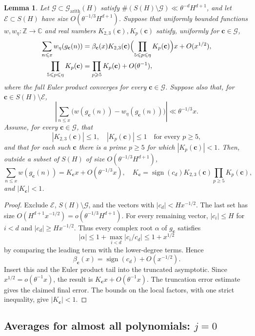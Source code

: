 \documentclass[12pt,reqno]{amsart}
\numberwithin{equation}{section}
\newtheorem{lemma}[theorem]{Lemma}
\theoremstyle{definition}
\renewcommand{\le}{\leqslant}
\renewcommand{\ge}{\geqslant}
\newcommand{\ZZ}{\mathbb{Z}}
\newcommand{\CC}{\mathbb{C}}
\newcommand{\cc}{\mathbf{c}}
\DeclareMathOperator{\sign}{sign}
\begin{document}
\begin{lemma}\label{lem:final-assembly}
Let $\mathcal G\subset\mathcal G_{\mathrm{arith}}(H)$ satisfy $\#(S(H)\setminus\mathcal G)\ll\theta^{-d}H^{d+1}$, and let $\mathcal E\subset S(H)$ have size $O(\theta^{-1/3}H^{d+1})$.
Suppose that uniformly bounded functions $w,w_\eta:\ZZ\to\CC$ and real numbers $K_{2,3}(\cc),K_p(\cc)$ satisfy, uniformly for $\cc\in\mathcal G$,
\begin{align*}
\sum_{n\le x}w_\eta(g_\cc(n))
&=\beta_\cc(x)K_{2,3}(\cc)
  \Bigl(\prod_{5\le p\le\eta}K_p(\cc)\Bigr)x+O(x^{1/2}),\\
\prod_{5\le p\le\eta}K_p(\cc)
&=\prod_{p\ge5}K_p(\cc)+O(\theta^{-1}),
\end{align*}
where the full Euler product converges for every $\cc\in\mathcal G$.
Suppose also that, for $\cc\in S(H)\setminus\mathcal E$,
\[
\left|\sum_{n\le x}
\bigl(w(g_\cc(n))-w_\eta(g_\cc(n))\bigr)\right|
\ll\theta^{-1/3}x.
\]
Assume, for every $\cc\in\mathcal G$, that
\[
|K_{2,3}(\cc)|\le1,\quad |K_p(\cc)|\le1\quad\text{for every }p\ge5,
\]
and that for each such $\cc$ there is a prime $p\ge5$ for which $|K_p(\cc)|<1$.
Then, outside a subset of $S(H)$ of size $O(\theta^{-1/3}H^{d+1})$,
\[
\sum_{n\le x}w(g_\cc(n))
=K_\cc x+O(\theta^{-1/3}x),
\quad
K_\cc=\sign(c_d)K_{2,3}(\cc)\prod_{p\ge5}K_p(\cc),
\]
and $|K_\cc|<1$.
\end{lemma}

\begin{proof}
Exclude $\mathcal E$, $S(H)\setminus\mathcal G$, and the vectors with $|c_d|<Hx^{-1/2}$.
The last set has size $O(H^{d+1}x^{-1/2})=o(\theta^{-1/3}H^{d+1})$.
For every remaining vector, $|c_i|\le H$ for $i<d$ and
$|c_d|\ge Hx^{-1/2}$.
Thus every complex root $\alpha$ of $g_\cc$ satisfies
\[
|\alpha|\le1+\max_{i<d}|c_i/c_d|\le1+x^{1/2}
\]
by comparing the leading term with the lower-degree terms.
Hence
\begin{equation}\label{eq:beta-leading-sign}
\beta_\cc(x)=\sign(c_d)+O(x^{-1/2}).
\end{equation}
Insert this and the Euler product tail into the truncated asymptotic.
Since $x^{1/2}=o(\theta^{-1}x)$, the result is $K_\cc x+O(\theta^{-1}x)$.
The truncation error estimate gives the claimed final error.
The bounds on the local factors, with one strict inequality, give $|K_\cc|<1$.
\end{proof}

\subsection{Averages for almost all polynomials: \texorpdfstring{$j=0$}{j=0}}
\end{document}
